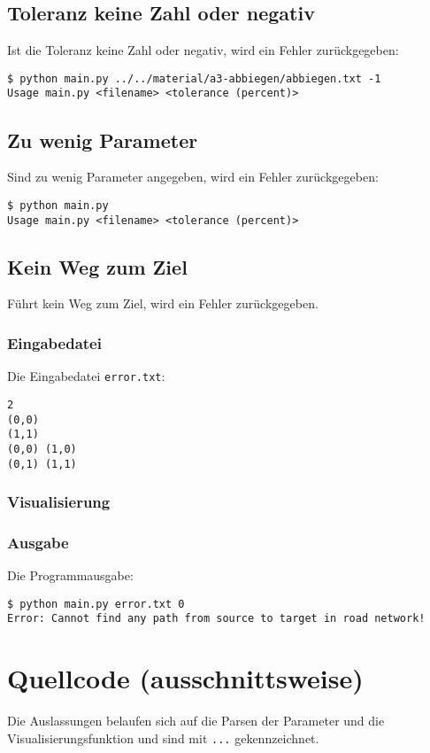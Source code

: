 \documentclass[a4paper,10pt,ngerman]{scrartcl}
\begin{document}
\subsection{Toleranz keine Zahl oder negativ}
Ist die Toleranz keine Zahl oder negativ, wird ein Fehler zurückgegeben:
\begin{lstlisting}
$ python main.py ../../material/a3-abbiegen/abbiegen.txt -1
Usage main.py <filename> <tolerance (percent)>
\end{lstlisting}

\subsection{Zu wenig Parameter}
Sind zu wenig Parameter angegeben, wird ein Fehler zurückgegeben:
\begin{lstlisting}
$ python main.py
Usage main.py <filename> <tolerance (percent)>
\end{lstlisting}

\subsection{Kein Weg zum Ziel}
Führt kein Weg zum Ziel, wird ein Fehler zurückgegeben.

\subsubsection{Eingabedatei}
Die Eingabedatei \texttt{error.txt}:
\begin{lstlisting}
2
(0,0)
(1,1)
(0,0) (1,0)
(0,1) (1,1)
\end{lstlisting}

\subsubsection{Visualisierung}


\subsubsection{Ausgabe}
Die Programmausgabe:
\begin{lstlisting}
$ python main.py error.txt 0
Error: Cannot find any path from source to target in road network!
\end{lstlisting}

\section{Quellcode (ausschnittsweise)}
Die Auslassungen belaufen sich auf die Parsen der Parameter und die Visualisierungsfunktion und sind mit \texttt{...} gekennzeichnet.


\printbibliography
\end{document}
